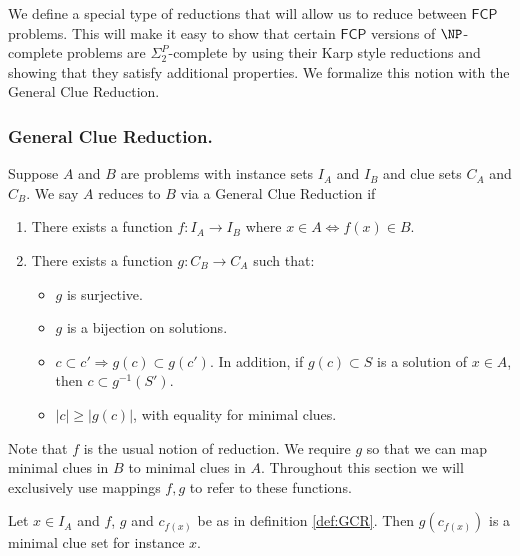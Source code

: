 \documentclass[runningheads,a4paper]{llncs}
\begin{document}
We define a special type of reductions that will allow us to reduce between $\mathsf{FCP}$ problems. This will make it easy to show that certain $\mathsf{FCP}$ versions of $\NP$-complete problems are $\Sigma_2^P$-complete by using their Karp style reductions and showing that they satisfy additional properties. We formalize this notion with the General Clue Reduction.

\subsubsection{General Clue Reduction.}

\begin{definition}\label{def:GCR}
Suppose $A$ and $B$ are problems with instance sets $I_A$ and $I_B$ and clue sets $C_A$ and $C_B$. We say $A$ reduces to $B$ via a General Clue Reduction if
\begin{enumerate}
\item There exists a function $f: I_A \rightarrow I_B$ where $x \in A \iff f(x) \in B$.
\item There exists a function $g: C_B \rightarrow C_A$ such that:
\begin{itemize}
\item $g$ is surjective. 
\item $g$ is a bijection on solutions.
\item $c \subset c' \Rightarrow g(c) \subset g(c')$. In addition, if $g(c) \subset S$ is a solution of $x \in A$, then $c \subset g^{-1}(S')$.
\item $|c| \geq |g(c)|$, with equality for minimal clues. 
\end{itemize}
\end{enumerate}
\end{definition}
Note that $f$ is the usual notion of reduction. We require $g$ so that we can map minimal clues in $B$ to minimal clues in $A$. Throughout this section we will exclusively use mappings $f, g$ to refer to these functions. 

\begin{lemma}\label{lemmaMinClue}
Let $x \in I_A$ and $f$, $g$ and $c_{f(x)}$ be as in definition \ref{def:GCR}. Then $g(c_{f(x)})$ is a minimal clue set for instance $x$.
\end{lemma}
\end{document}

